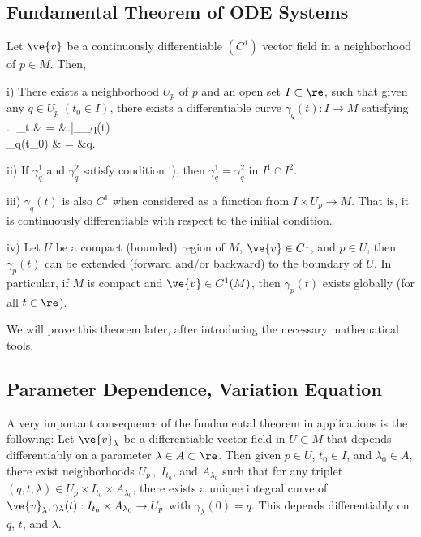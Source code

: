 \subsection{Fundamental Theorem of ODE Systems}
\bteo

Let $\ve{v}$ be a continuously differentiable $(C^1)$ vector field in a
neighborhood of $p\in M$. Then,

 i) There exists a neighborhood $U_p$ of $p$ and an open set $I\subset\re$,
such that given any $q\in U_p\;(t_0\in I) $, there exists a differentiable curve
$\gamma_q(t):I\to M$ satisfying 
\beq 
{}
  \left.  \dip{}\right|_t & = &\left.\right|_{\gamma_q(t)}  \\
    \gamma_q(t_0) & = &q.
      \earr
\eeq

 ii) If $\gamma_q^1$ and $\gamma_q^2$ satisfy condition i), then
     $\gamma_q^1=\gamma_q^2$ in $I^1\cap I^2$.

iii) $\gamma_q(t)$ is also $C^1$ when considered as
a function from $I\times U_p\to M$. That is, it is continuously
differentiable with respect to the initial condition.

 iv) Let $U$ be a compact (bounded) region of $M$, $\ve{v}\in C^1$,
and $ p\in U$, then $\gamma_p(t)$ can be extended (forward and/or
backward) to the boundary of $U$. In particular, if $M$ is compact
and $\ve{v}\in C^1(M)$, then $\gamma_p(t)$ exists globally (for all 
$t \in \re$).

\eteo


We will prove this theorem later, after introducing the necessary
mathematical tools.




\subsection{Parameter Dependence, Variation Equation}

A very important consequence of the fundamental theorem in applications is the following:
\bcor
Let $\ve{v}_{\lambda}$ be a differentiable vector field in $U\subset M $ that depends
differentiably on a parameter $\lambda\in A \subset \re$. Then given
$p\in U$, $t_0\in I$, and $\lambda_0\in A$, there exist neighborhoods
$U_p\,,\;I_{t_0} $, and $A_{\lambda_0}$ such that for any triplet
$(q,t,\lambda) \in U_p\times I_{t_0}\times A_{\lambda_0}$, there exists a
unique integral curve of
$\ve{v}_{\lambda},\gamma_{\lambda}(t):I_{t_0}\times A_{\lambda_0}\to U_p$
with $\gamma_{\lambda}(0)=q$. This depends differentiably on $q$, $t$, 
and $\lambda$.
\ecor

